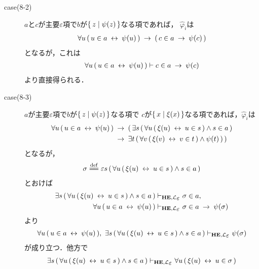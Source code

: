 \begin{metaprf}
\begin{description}
\begin{description}
					\item[case(8-2)] $a$と$c$が主要$\varepsilon$項で$b$が$\{\, z \mid \psi(z)\, \}$なる項であれば，
						$\widehat{\varphi}_{i}$は
						\begin{align}
							\forall u\, (\, u \in a \hspace{0.25em}\leftrightarrow\hspace{0.25em} \psi(u)\, ) 
							\hspace{0.25em}\rightarrow\hspace{0.25em} (\, c \in a \hspace{0.25em}\rightarrow\hspace{0.25em} \psi(c)\, )
						\end{align}
						となるが，これは
						\begin{align}
							\forall u\, (\, u \in a \hspace{0.25em}\leftrightarrow\hspace{0.25em} \psi(u)\, ) \vdash c \in a \hspace{0.25em}\rightarrow\hspace{0.25em} \psi(c)
						\end{align}
						より直接得られる．
						
					\item[case(8-3)] $a$が主要$\varepsilon$項で$b$が$\{\, z \mid \psi(z)\, \}$なる項で
						$c$が$\{\, x \mid \xi(x)\, \}$なる項であれば，$\widehat{\varphi}_{i}$は
						\begin{align}
							\forall u\, (\, u \in a \hspace{0.25em}\leftrightarrow\hspace{0.25em} \psi(u)\, ) 
							&\hspace{0.25em}\rightarrow\hspace{0.25em} (\, \exists s\, (\, \forall u\, (\, \xi(u) \hspace{0.25em}\leftrightarrow\hspace{0.25em} u \in s\, ) \wedge s \in a\, ) \\
							&\hspace{0.25em}\rightarrow\hspace{0.25em} \exists t\, (\, \forall v\, (\, \xi(v) \hspace{0.25em}\leftrightarrow\hspace{0.25em} v \in t\, ) \wedge \psi(t)\, )\, )
						\end{align}
						となるが，
						\begin{align}
							\sigma \defeq \varepsilon s\, (\, \forall u\, (\, \xi(u) \lrarrow u \in s\, ) \wedge s \in a\, )
						\end{align}
						とおけば
						\begin{align}
							\exists s\, (\, \forall u\, (\, \xi(u) \lrarrow u \in s\, ) \wedge s \in a\, ) 
							&\provable{\mbox{{\bf HE}},\lang{\varepsilon}} \sigma \in a, \\
							\forall u\, (\, u \in a \lrarrow \psi(u)\, )
							&\provable{\mbox{{\bf HE}},\lang{\varepsilon}} \sigma \in a \rarrow \psi(\sigma)
						\end{align}
						より
						\begin{align}
							\forall u\, (\, u \in a \lrarrow \psi(u)\, ),\ 
							\exists s\, (\, \forall u\, (\, \xi(u) \lrarrow u \in s\, ) \wedge s \in a\, ) 
							\provable{\mbox{{\bf HE}},\lang{\varepsilon}} \psi(\sigma)
						\end{align}
						が成り立つ．他方で
						\begin{align}
							\exists s\, (\, \forall u\, (\, \xi(u) \lrarrow u \in s\, ) \wedge s \in a\, ) 
							\provable{\mbox{{\bf HE}},\lang{\varepsilon}} \forall u\, (\, \xi(u) \lrarrow u \in \sigma\, )

\end{align}
\end{description}
\end{description}
\end{metaprf}
